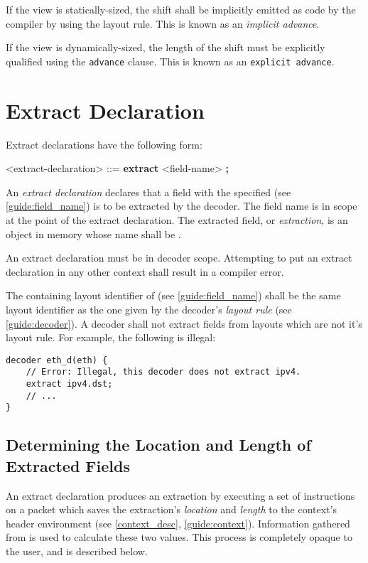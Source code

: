 If the view is statically-sized, the shift shall be implicitly emitted as code by the compiler by using the layout rule. This is known as an \textit{implicit advance}.

If the view is dynamically-sized, the length of the shift must be explicitly qualified using the \texttt{\color{blue}advance} clause. This is known as an \texttt{explicit advance}.

\section{Extract Declaration} \label{guide:extract}

Extract declarations have the following form:

\begin{grammar}
<extract-declaration> ::=
\textbf{extract} <field-name> \textbf{;}
\end{grammar}

An \textit{extract declaration} declares that a field with the specified  (see \ref{guide:field_name}) is to be extracted by the decoder. The field name is in scope at the point of the extract declaration. The extracted field, or \textit{extraction}, is an object in memory whose name shall be .

An extract declaration must be in decoder scope. Attempting to put an extract declaration in any other context shall result in a compiler error.

The containing layout identifier of  (see \ref{guide:field_name}) shall be the same layout identifier as the one given by the decoder's \textit{layout rule} (see \ref{guide:decoder}). A decoder shall not extract fields from layouts which are not it's layout rule. For example, the following is illegal:

\begin{minip}
\begin{lstlisting}
decoder eth_d(eth) {
	// Error: Illegal, this decoder does not extract ipv4.
	extract ipv4.dst; 
	// ...
}
\end{lstlisting}
\end{minip}

\subsection{Determining the Location and Length of Extracted Fields}

An extract declaration produces an extraction by executing a set of instructions on a packet which saves the extraction's \textit{location} and \textit{length} to the context's header environment (see \ref{context_desc}, \ref{guide:context}). Information gathered from  is used to calculate these two values. This process is completely opaque to the user, and is described below.

